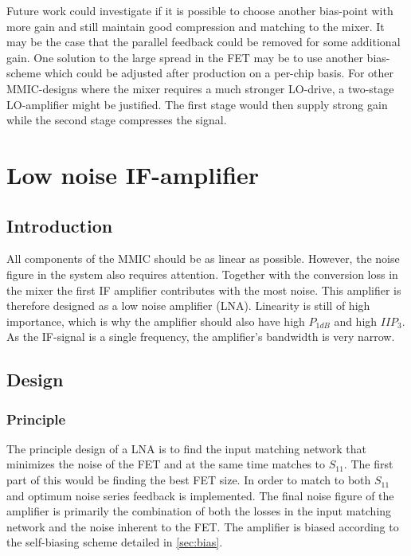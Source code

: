 		Future work could investigate if it is possible to choose another bias-point with more gain and still maintain good compression and matching to the mixer. It may be the case that the parallel feedback could be removed for some additional gain.  One solution to the large spread in the FET may be to use another bias-scheme which could be adjusted after production on a per-chip basis.
		For other MMIC-designs where the mixer requires a much stronger LO-drive, a two-stage LO-amplifier might be justified. The first stage would then supply strong gain while the second stage compresses the signal. 

	\section{Low noise IF-amplifier}
		\subsection{Introduction}
			All components of the MMIC should be as linear as possible. However, the noise figure in the system also requires attention. Together with the conversion loss in the mixer the first IF amplifier contributes with the most noise. This amplifier is therefore designed as a low noise amplifier (LNA). Linearity is still of high importance, which is why the amplifier should also have high $P_{1dB}$ and high $IIP_3$. As the IF-signal is a single frequency, the amplifier's bandwidth is very narrow.

		\subsection{Design}
			\subsubsection{Principle}
				The principle design of a LNA is to find the input matching network that minimizes the noise of the FET and at the same time matches to $S_{11}$. The first part of this would be finding the best FET size. In order to match to both $S_{11}$ and optimum noise series feedback is implemented.\autocite{lehmann85} The final noise figure of the amplifier is primarily the combination of both the losses in the input matching network and the noise inherent to the FET. The amplifier is biased according to the self-biasing scheme detailed in \autoref{sec:bias}.

